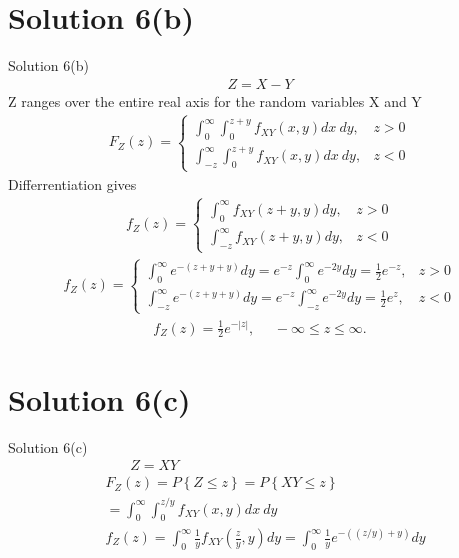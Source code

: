 \documentclass{beamer}
\providecommand{\brak}[1]{\ensuremath{\left(#1\right)}}
\providecommand{\cbrak}[1]{\ensuremath{\left\{#1\right\}}}
\theoremstyle{remark}
\numberwithin{equation}{section}
\numberwithin{figure}{section}
\numberwithin{table}{section}
\begin{document}
\section{Solution 6(b)}
\begin{frame}{Solution 6(b)}
\begin{align}
    Z = X - Y
\end{align}
Z ranges over the entire real axis for the random variables X and Y
\begin{align}
  F_Z\brak{z} = 
  \begin{cases}
    \int_0^\infty \int_0^{z+y} f_{XY}\brak{x,y}dx~dy,  & z > 0\\
    \int_{-z}^\infty \int_0^{z+y} f_{XY}\brak{x,y}dx~dy, & z < 0
  \end{cases}
\end{align}
Differrentiation gives
\begin{align}
  f_Z\brak{z} = 
  \begin{cases}
    \int_0^\infty f_{XY}\brak{z+y,y}dy,  & z > 0\\
    \int_{-z}^\infty f_{XY}\brak{z+y,y}dy, & z < 0
  \end{cases}
\end{align}
\begin{align}
  f_Z\brak{z} = 
  \begin{cases}
    \int_0^\infty e^{-\brak{z+y+y}}dy = e^{-z}\int_0^\infty e^{-2y}dy = \frac{1}{2}e^{-z}, & z > 0\\
    \int_{-z}^\infty e^{-\brak{z+y+y}}dy = e^{-z}\int_{-z}^\infty e^{-2y}dy = \frac{1}{2}e^{z},& z < 0
  \end{cases}
\end{align}
\begin{align}
  f_Z\brak{z} = \frac{1}{2}e^{-|z|},~~~~~~ -\infty \leq z \leq \infty .
\end{align}
\end{frame} 
\section{Solution 6(c)}
\begin{frame}{Solution 6(c)}
  \begin{align}
    &~~~~~~~~Z = XY\\
    &F_Z\brak{z} = P\cbrak{Z \leq z} = P\cbrak{XY \leq z }\\
    & = \int_0^\infty \int_0^{z/y} f_{XY}\brak{x,y}dx~dy\\
    &f_Z\brak{z} = \int_0^\infty \frac{1}{y}f_{XY} \brak{\frac{z}{y},y} dy = \int_0^\infty \frac{1}{y}e^{-\brak{\brak{z/y}+y}}dy
  \end{align}
\end{frame}
\end{document}
